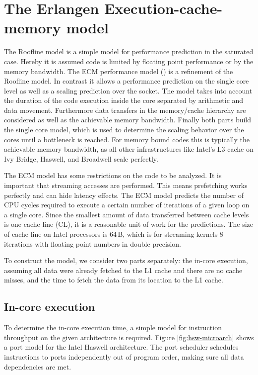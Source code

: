 \section{The Erlangen Execution-cache-memory model}

The Roofline model is a simple model
for performance prediction in the saturated case.
Hereby it is assumed code is limited by floating point performance or by the
memory bandwidth.
The ECM performance model (\cite{treibig-2010-ecm,hager-2012-ecm}) is a refinement
of the Roofline model. 
In contrast it allows a performance prediction on the single core level as well
as a scaling prediction over the socket.
The model takes into account the duration of the code execution inside the core
separated by arithmetic and data movement.
Furthermore data transfers in the memory/cache hierarchy are considered as well
as the achievable memory bandwidth.
%
Finally both parts build the single core model, which is used to determine the
scaling behavior over the cores until a bottleneck is reached. 
%
For memory bound codes this is typically the achievable memory bandwidth,   as all
other infrastructures like Intel's L3 cache on Ivy Bridge, Haswell, and Broadwell
scale perfectly. 

The ECM model has some restrictions on the code to be analyzed.
It is important that streaming accesses are performed. This means prefetching
works perfectly and can hide latency effects.
The ECM model predicts the number of CPU cycles required to execute a certain number of iterations of a given loop on a single core. Since the smallest amount of data transferred between cache levels is one cache line (CL), it is a reasonable unit of work for the predictions. The size of cache line on Intel processors is 64\,B, which is for streaming kernels 8 iterations with floating point numbers in double precision.

To construct the model, we consider two parts separately: the in-core execution, assuming all data were already fetched to the L1 cache and there are no cache misses, and the time to fetch the data from its location to the L1 cache.

\subsection*{In-core execution}

To determine the in-core execution time, a simple model for instruction throughput on the given architecture is required. Figure \ref{fig:hsw-microarch} shows a port model for the Intel Haswell architecture. The port scheduler schedules instructions to ports independently out of program order, making sure all data dependencies are met.

